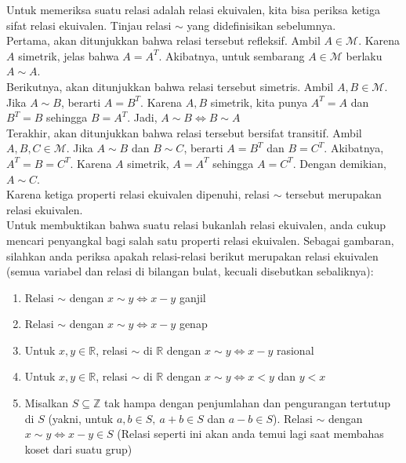 	Untuk memeriksa suatu relasi adalah relasi ekuivalen, kita bisa periksa ketiga sifat relasi ekuivalen. Tinjau relasi $\sim$ yang didefinisikan sebelumnya. 
	\\
	
	Pertama, akan ditunjukkan bahwa relasi tersebut refleksif. Ambil $A \in \mathcal{M}$. Karena $A$ simetrik, jelas bahwa $A = A^{T}$. Akibatnya, untuk sembarang $A \in \mathcal{M}$ berlaku $A \sim A$.
	\\
	
	Berikutnya, akan ditunjukkan bahwa relasi tersebut simetris. Ambil $A,B \in \mathcal{M}$. Jika $A \sim B$, berarti $A = B^{T}$. Karena $A,B$ simetrik, kita punya $A^T = A$ dan $B^T = B$ sehingga $B = A^T$. Jadi, $A \sim B \iff B \sim A$
	\\
	
	Terakhir, akan ditunjukkan bahwa relasi tersebut bersifat transitif. Ambil $A,B,C \in \mathcal{M}$. Jika $A \sim B$ dan $B \sim C$, berarti $A = B^T$ dan $B = C^T$. Akibatnya, $A^T = B = C^T$. Karena $A$ simetrik, $A = A^T$ sehingga $A = C^T$. Dengan demikian, $A \sim C$.
	\\
	
	Karena ketiga properti relasi ekuivalen dipenuhi, relasi $\sim$ tersebut merupakan relasi ekuivalen.
	\\
	
	Untuk membuktikan bahwa suatu relasi bukanlah relasi ekuivalen, anda cukup mencari penyangkal bagi salah satu properti relasi ekuivalen. Sebagai gambaran, silahkan anda periksa apakah relasi-relasi berikut merupakan relasi ekuivalen (semua variabel dan relasi di bilangan bulat, kecuali disebutkan sebaliknya):
	\begin{enumerate}
		\item Relasi $\sim$ dengan $x \sim y \iff x - y$ ganjil
		\item Relasi $\sim$ dengan $x \sim y \iff x - y$ genap
		\item Untuk $x,y \in \mathbb{R}$, relasi $\sim$ di $\mathbb{R}$ dengan $x \sim y \iff x -y$ rasional
		\item Untuk $x,y \in \mathbb{R}$, relasi $\sim$ di $\mathbb{R}$ dengan $x \sim y \iff x < y$ dan $y < x$
		\item Misalkan $S \subseteq \mathbb{Z}$ tak hampa dengan penjumlahan dan pengurangan tertutup di $S$ (yakni, untuk $a,b \in S, \ a+b \in S$ dan $a-b \in S$). Relasi $\sim$ dengan $x \sim y \iff x-y \in S$  (Relasi seperti ini akan anda temui lagi saat membahas koset dari suatu grup)
	\end{enumerate}
